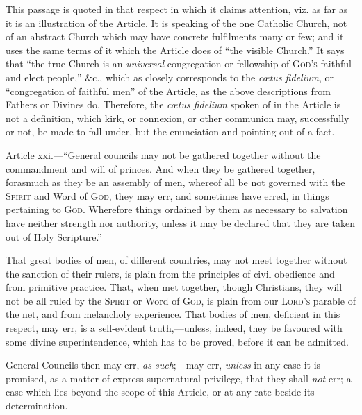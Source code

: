 This passage is quoted in that respect in which it claims
attention, viz. as far as it is an illustration of the Article. It is
speaking of the one Catholic Church, not of an abstract Church which
may have concrete fulfilments many or few; and it uses the same terms
of it which the Article does of ``the visible Church.'' It
says that ``the true Church is an \emph{universal} congregation or
fellowship of G\textsc{od's} faithful and elect
people,'' \&c., which as closely corresponds to the \emph{cœtus
fidelium}, or ``congregation of faithful men'' of the
Article, as the above descriptions from Fathers or Divines do.
Therefore, the \emph{cœtus fidelium} spoken of in the Article is not
a definition, which kirk, or connexion, or other communion may,
successfully or not, be made to fall under, but the enunciation and
pointing out of a fact.


Article xxi.—``General councils may not be gathered together
without the commandment and will of princes. And when they be gathered
together, forasmuch as they be an assembly of men, whereof all be not
governed with the S\textsc{pirit} and Word of G\textsc{od},
they may err, and sometimes have erred, in things pertaining to G\textsc{od}.
Wherefore things ordained by them as necessary to salvation have
neither strength nor authority, unless it may be declared that they
are taken out of Holy Scripture.''

That great bodies of men, of different countries, may not meet
together without the sanction of their rulers, is plain from the
principles of civil obedience and from primitive practice. That, when
met together, though Christians, they will not be all ruled by the S\textsc{pirit}
or Word of G\textsc{od}, is plain from our L\textsc{ord's}
parable of the net, and from melancholy experience. That bodies of
men, deficient in this respect, may err, is a sell-evident truth,—unless,
indeed, they be favoured with some divine superintendence, which has
to be proved, before it can be admitted.

General Councils then may err, \emph{as such};—may err, \emph{unless}
in any case it is promised, as a matter of express supernatural
privilege, that they shall \emph{not} err; a case which lies beyond
the scope of this Article, or at any rate beside its determination.

